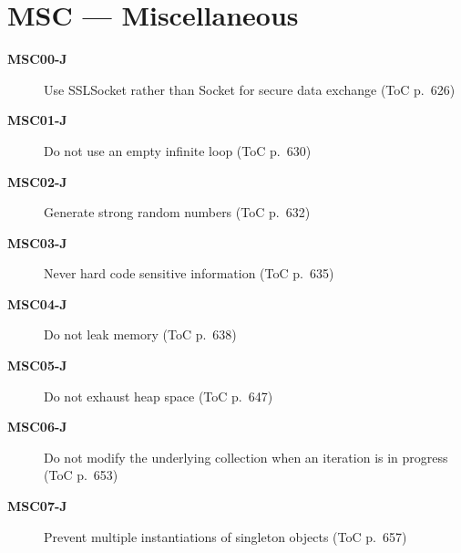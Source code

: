 \documentclass[11pt]{report}
\begin{document}
\chapter{MSC — Miscellaneous}
\begin{description}
\item[\textbf{MSC00-J}] Use SSLSocket rather than Socket for secure data exchange (ToC p.~626)
\item[\textbf{MSC01-J}] Do not use an empty infinite loop (ToC p.~630)
\item[\textbf{MSC02-J}] Generate strong random numbers (ToC p.~632)
\item[\textbf{MSC03-J}] Never hard code sensitive information (ToC p.~635)
\item[\textbf{MSC04-J}] Do not leak memory (ToC p.~638)
\item[\textbf{MSC05-J}] Do not exhaust heap space (ToC p.~647)
\item[\textbf{MSC06-J}] Do not modify the underlying collection when an iteration is in progress (ToC p.~653)
\item[\textbf{MSC07-J}] Prevent multiple instantiations of singleton objects (ToC p.~657)
\end{description}
\clearpage
\appendix
\end{document}
